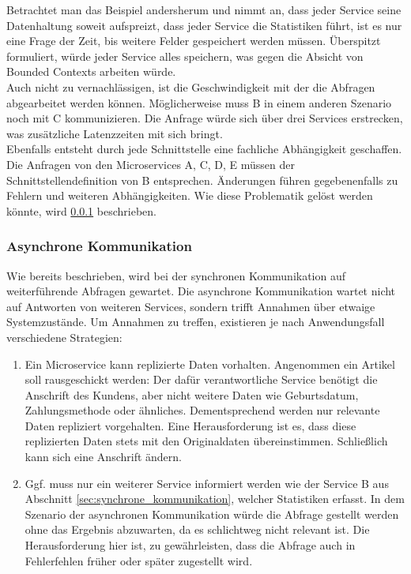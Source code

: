Betrachtet man das Beispiel andersherum und nimmt an, dass jeder Service seine Datenhaltung soweit aufspreizt, dass jeder Service die Statistiken führt, ist es nur eine Frage der Zeit, bis weitere Felder gespeichert werden müssen. Überspitzt formuliert, würde jeder Service alles speichern, was gegen die Absicht von Bounded Contexts arbeiten würde.\cite{wolff2018mic_praxis} \\

Auch nicht zu vernachlässigen, ist die Geschwindigkeit mit der die Abfragen abgearbeitet werden können. Möglicherweise muss B in einem anderen Szenario noch mit C kommunizieren. Die Anfrage würde sich über drei Services erstrecken, was zusätzliche Latenzzeiten mit sich bringt.\cite{wolff2018mic_praxis} \\   

Ebenfalls entsteht durch jede Schnittstelle eine fachliche Abhängigkeit geschaffen.\cite{bruce2019mic_in_action} Die Anfragen von den Microservices A, C, D, E müssen der Schnittstellendefinition von B entsprechen. Änderungen führen gegebenenfalls zu Fehlern und weiteren Abhängigkeiten. Wie diese Problematik gelöst werden könnte, wird \ref{sec:asynchrone_kommunikation} beschrieben.

\subsubsection{Asynchrone Kommunikation}\label{sec:asynchrone_kommunikation}

Wie bereits beschrieben, wird bei der synchronen Kommunikation auf weiterführende Abfragen gewartet. Die asynchrone Kommunikation wartet nicht auf Antworten von weiteren Services, sondern trifft Annahmen über etwaige Systemzustände.\cite{wolff2018mic_praxis} Um Annahmen zu treffen, existieren je nach Anwendungsfall verschiedene Strategien:

\begin{enumerate}
\item{ Ein Microservice kann replizierte Daten vorhalten. Angenommen ein Artikel soll rausgeschickt werden: Der dafür verantwortliche Service benötigt die Anschrift des Kundens, aber nicht weitere Daten wie Geburtsdatum, Zahlungsmethode oder ähnliches. Dementsprechend werden nur relevante Daten repliziert vorgehalten. Eine Herausforderung ist es, dass diese replizierten Daten stets mit den Originaldaten übereinstimmen. Schließlich kann sich eine Anschrift ändern.\cite{wolff2018mic_praxis}}

\item{Ggf. muss nur ein weiterer Service informiert werden wie der Service B aus Abschnitt \ref{sec:synchrone_kommunikation}, welcher Statistiken erfasst. In dem Szenario der asynchronen Kommunikation würde die Abfrage gestellt werden ohne das Ergebnis abzuwarten, da es schlichtweg nicht relevant ist. Die Herausforderung hier ist, zu gewährleisten, dass die Abfrage auch in Fehlerfehlen früher oder später zugestellt wird.}
\end{enumerate}

